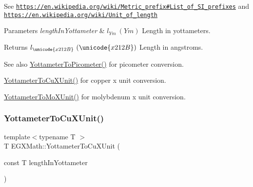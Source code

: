 See \href{https://en.wikipedia.org/wiki/Metric_prefix#List_of_SI_prefixes}{\tt https\+://en.\+wikipedia.\+org/wiki/\+Metric\+\_\+prefix\#\+List\+\_\+of\+\_\+\+S\+I\+\_\+prefixes} and \href{https://en.wikipedia.org/wiki/Unit_of_length}{\tt https\+://en.\+wikipedia.\+org/wiki/\+Unit\+\_\+of\+\_\+length} 
\begin{DoxyParams}{Parameters}
{\em length\+In\+Yottameter} & $ l_{Ym}\ (Ym)$ Length in yottameters. \\
\hline
\end{DoxyParams}
\begin{DoxyReturn}{Returns}
$ l_{\unicode{x212B}}\ (\unicode{x212B})$ Length in angstroms. 
\end{DoxyReturn}
\begin{DoxySeeAlso}{See also}
\mbox{\hyperlink{group___e_g_x_math-_conversions-_length_conversions-_yottameter-_s_i_ga7af9d1314de06921546f079641c033b2}{Yottameter\+To\+Picometer()}} for picometer conversion. 

\mbox{\hyperlink{group___e_g_x_math-_conversions-_length_conversions-_yottameter-_non-_s_i_ga5c8a9868ad238225dbf8ebdbfad13930}{Yottameter\+To\+Cu\+X\+Unit()}} for copper x unit conversion. 

\mbox{\hyperlink{group___e_g_x_math-_conversions-_length_conversions-_yottameter-_non-_s_i_ga545da9526f7a62f5ca7d1800faf17d1d}{Yottameter\+To\+Mo\+X\+Unit()}} for molybdenum x unit conversion. 
\end{DoxySeeAlso}
\mbox{\label{group___e_g_x_math-_conversions-_length_conversions-_yottameter-_non-_s_i_ga5c8a9868ad238225dbf8ebdbfad13930}} 
\subsubsection{\texorpdfstring{Yottameter\+To\+Cu\+X\+Unit()}{YottameterToCuXUnit()}}
{\footnotesize\ttfamily template$<$typename T $>$ \\
T E\+G\+X\+Math\+::\+Yottameter\+To\+Cu\+X\+Unit (\begin{DoxyParamCaption}\item[{const T}]{length\+In\+Yottameter }\end{DoxyParamCaption})}



